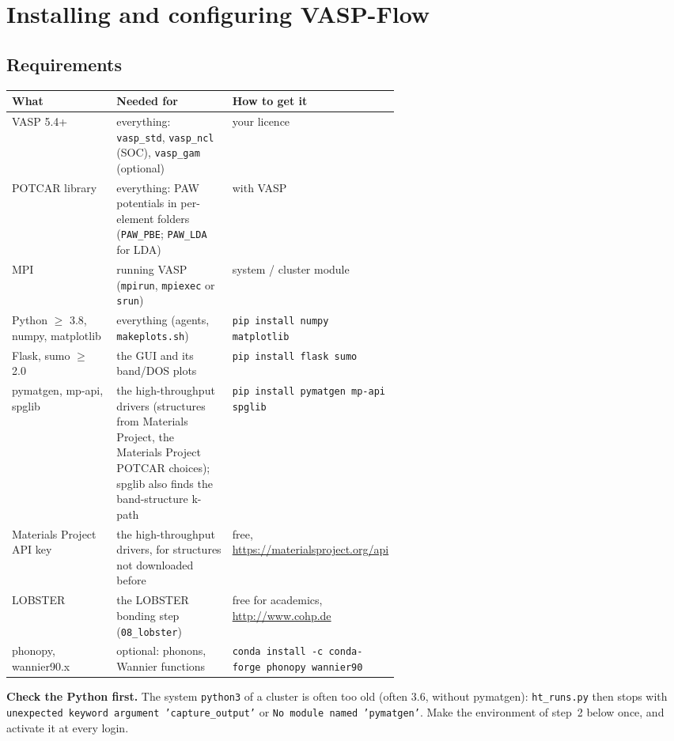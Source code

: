 \documentclass[11pt,a4paper]{scrartcl}
\newcommand{\thead}{\rowcolor{lightblue}}
\begin{document}
\section{Installing and configuring VASP-Flow}
\label{sec:install}

\subsection{Requirements}

\begin{tabularx}{\linewidth}{@{}>{\raggedright\arraybackslash}p{0.27\linewidth}>{\raggedright\arraybackslash}X>{\raggedright\arraybackslash}p{0.3\linewidth}@{}}
\thead
What & Needed for & How to get it \\ \midrule
VASP 5.4+ & everything: \texttt{vasp\_std}, \texttt{vasp\_ncl} (SOC), \texttt{vasp\_gam} (optional) & your licence \\
POTCAR library & everything: PAW potentials in per-element folders (\texttt{PAW\_PBE}; \texttt{PAW\_LDA} for LDA) & with VASP \\
MPI & running VASP (\texttt{mpirun}, \texttt{mpiexec} or \texttt{srun}) & system / cluster module \\
Python $\geq$ 3.8, numpy, matplotlib & everything (agents, \texttt{makeplots.sh}) & \texttt{pip install numpy matplotlib} \\
Flask, sumo $\geq$ 2.0 & the GUI and its band/DOS plots & \texttt{pip install flask sumo} \\
pymatgen, mp-api, spglib & the high-throughput drivers (structures from Materials Project, the
  Materials Project POTCAR choices); spglib also finds the band-structure k-path &
  \texttt{pip install pymatgen mp-api spglib} \\
Materials Project API key & the high-throughput drivers, for structures not downloaded before &
  free, \url{https://materialsproject.org/api} \\
LOBSTER & the LOBSTER bonding step (\texttt{08\_lobster}) & free for academics, \url{http://www.cohp.de} \\
phonopy, wannier90.x & optional: phonons, Wannier functions & \texttt{conda install -c conda-forge phonopy wannier90} \\
\bottomrule
\end{tabularx}

\medskip\noindent\textbf{Check the Python first.}  The system \texttt{python3} of a cluster is often too old
(often 3.6, without pymatgen): \texttt{ht\_runs.py} then stops with
\texttt{unexpected keyword argument 'capture\_output'} or \texttt{No module named 'pymatgen'}.
Make the environment of step~2 below once, and activate it at every login.
\end{document}
